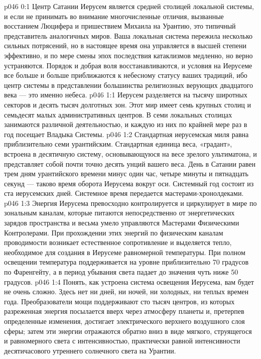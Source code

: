 \author{Архангел}
\vs p046 0:1 Центр Сатании Иерусем является средней столицей локальной системы, и если не принимать во внимание многочисленные отличия, вызванные восстанием Люцифера и пришествием Михаила на Урантию, это типичный представитель аналогичных миров. Ваша локальная система пережила несколько сильных потрясений, но в настоящее время она управляется в высшей степени эффективно, и по мере смены эпох последствия катаклизмов медленно, но верно устраняются. Порядок и добрая воля восстанавливаются, и условия на Иерусеме все больше и больше приближаются к небесному статусу ваших традиций, ибо центр системы в представлении большинства религиозных верующих двадцатого века --- это именно небеса.
\vs p046 1:1 Иерусем разделяется на тысячу широтных секторов и десять тысяч долготных зон. Этот мир имеет семь крупных столиц и семьдесят малых административных центров. В семи локальных столицах занимаются различной деятельностью, и каждую из них по крайней мере раз в год посещает Владыка Системы.
\vs p046 1:2 \pc Стандартная иерусемская миля равна приблизительно семи урантийским. Стандартная единица веса, «градант», встроена в десятичную систему, основывающуюся на весе зрелого ультиматона, и представляет собой почти точно десять унций вашего веса. День в Сатании равен трем дням урантийского времени минус один час, четыре минуты и пятнадцать секунд --- таково время оборота Иерусема вокруг оси. Системный год состоит из ста иерусемских дней. Системное время передается мастерами\hyp{}хронолдеками.
\vs p046 1:3 \pc Энергия Иерусема превосходно контролируется и циркулирует в мире по зональным каналам, которые питаются непосредственно от энергетических зарядов пространства и весьма умело управляются Мастерами Физическими Контролерами. При прохождении этих энергий по физическим каналам проводимости возникает естественное сопротивление и выделяется тепло, необходимое для создания в Иерусеме равномерной температуры. При полном освещении температура поддерживается на уровне приблизительно 70 градусов по Фаренгейту, а в период убывания света падает до значения чуть ниже 50 градусов.
\vs p046 1:4 \pc Понять, как устроена система освещения Иерусема, вам будет не очень сложно. Здесь нет ни дней, ни ночей, ни холодных, ни теплых времен года. Преобразователи мощи поддерживают сто тысяч центров, из которых разреженная энергия посылается вверх через атмосферу планеты и, претерпев определенные изменения, достигает электрического верхнего воздушного слоя сферы; затем эти энергии отражаются обратно вниз в виде мягкого, струящегося и равномерного света с интенсивностью, практически равной интенсивности десятичасового утреннего солнечного света на Урантии.
